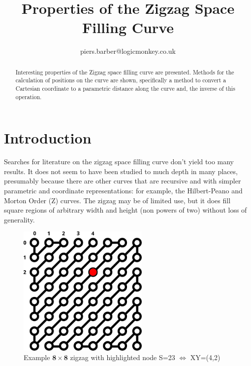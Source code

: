 \documentclass[10pt]{article}
\theoremstyle{theorem}
\begin{document}
\title{\LARGE Properties of the Zigzag Space Filling Curve}
\author{piers.barber@logicmonkey.co.uk}

\maketitle

\begin{abstract}
  Interesting properties of the Zigzag space filling curve are presented.
  Methods for the calculation of positions on the curve are shown, specifically
  a method to convert a Cartesian coordinate to a parametric distance along the
  curve and, the inverse of this operation.
\end{abstract}


\section{Introduction}

Searches for literature on the zigzag space filling curve don't yield too
many results. It does not seem to have been studied to much depth in many
places, presumably because there are other curves that are recursive and
with simpler parametric and coordinate representations: for example, the
Hilbert-Peano \cite{hilbert} and Morton Order (Z) \cite{zfill}  curves. The
zigzag may be of limited use, but it does fill square regions of arbitrary
width and height (non powers of two) without loss of generality.

\begin{figure}[h]
  \centering
  \includegraphics[width=2.5in]{zz_example}
  \caption{Example $\mathbf{8\times8}$ zigzag with highlighted node S=23
  $\Leftrightarrow$ XY=(4,2)}
  \label{fig:example}
\end{figure}
\end{document}
